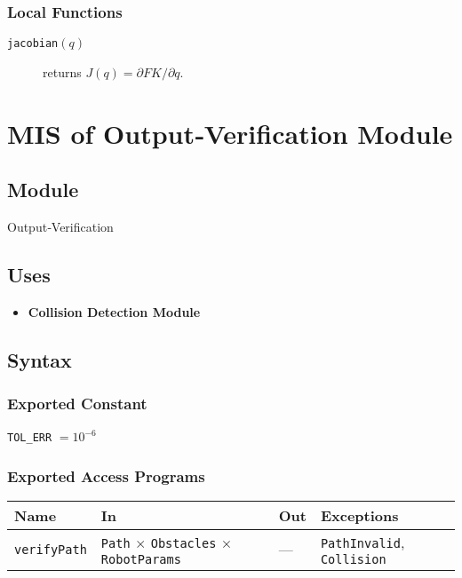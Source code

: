 \documentclass[12pt, titlepage]{article}
\begin{document}
\subsubsection{Local Functions}
\begin{description}
  \item[\texttt{jacobian}$(q)$] returns $J(q)=\partial FK/\partial q$.
\end{description}

\newpage
\section{MIS of Output‑Verification Module}
\label{mod:verify}

\subsection{Module}
Output‑Verification

\subsection{Uses}
\begin{itemize}
  \item \textbf{Collision Detection Module}
\end{itemize}

\subsection{Syntax}
\subsubsection{Exported Constant}
\texttt{TOL\_ERR} $=10^{-6}$

\subsubsection{Exported Access Programs}
\begin{center}
\renewcommand{\arraystretch}{1.3}
\begin{tabular}{p{3cm} p{6.5cm} p{3cm} p{3cm}}
\toprule
\textbf{Name} & \textbf{In} & \textbf{Out} & \textbf{Exceptions}\\ \midrule
\texttt{verifyPath} & \texttt{Path} $\times$ \texttt{Obstacles} $\times$ \texttt{RobotParams} & --- & \texttt{PathInvalid}, \texttt{Collision}\\
\bottomrule
\end{tabular}
\end{center}
\end{document}
